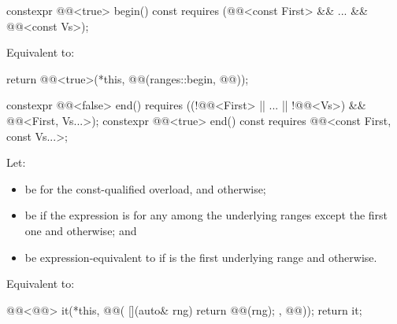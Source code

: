 %
\begin{itemdecl}
constexpr @@<true> begin() const
  requires (@@<const First> && ... && @@<const Vs>);
\end{itemdecl}

\begin{itemdescr}
\pnum
\effects
Equivalent to:
\begin{codeblock}
return @@<true>(*this, @@(ranges::begin, @@));
\end{codeblock}
\end{itemdescr}

%
\begin{itemdecl}
constexpr @@<false> end()
  requires ((!@@<First> || ... || !@@<Vs>)
    && @@<First, Vs...>);
constexpr @@<true> end() const
  requires @@<const First, const Vs...>;
\end{itemdecl}

\begin{itemdescr}
\pnum
Let:
\begin{itemize}
\item
{} be  for the const-qualified overload, and
 otherwise;
\item
{} be 
if the expression  is 
for any  among the underlying ranges except the first one and
 otherwise; and
\item
{} be expression-equivalent to
if  is the first underlying range and
 otherwise.
\end{itemize}

\pnum
\effects
Equivalent to:
\begin{codeblock}
@@<@@> it(*this, @@(
  [](auto& rng){ return @@(rng); }, @@));
return it;
\end{codeblock}
\end{itemdescr}

